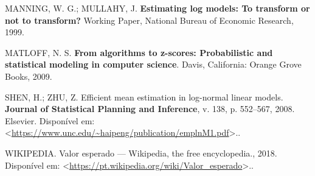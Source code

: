\documentclass[a4paper]{article}
\begin{document}
\hypertarget{ref-NBERt0246}{}
MANNING, W. G.; MULLAHY, J. \textbf{Estimating log models: To transform
or not to transform?} Working Paper, National Bureau of Economic
Research, 1999.

\hypertarget{ref-matloff2009}{}
MATLOFF, N. S. \textbf{From algorithms to z-scores: Probabilistic and
statistical modeling in computer science}. Davis, California: Orange
Grove Books, 2009.

\hypertarget{ref-shen}{}
SHEN, H.; ZHU, Z. Efficient mean estimation in log-normal linear models.
\textbf{Journal of Statistical Planning and Inference}, v. 138, p.
552--567, 2008. Elsevier. Disponível em:
\textless{}\url{https://www.unc.edu/~haipeng/publication/emplnM1.pdf}\textgreater{}..

\hypertarget{ref-wiki:E}{}
WIKIPEDIA. Valor esperado --- Wikipedia, the free encyclopedia., 2018.
Disponível em:
\textless{}\url{https://pt.wikipedia.org/wiki/Valor_esperado}\textgreater{}..
\end{document}
